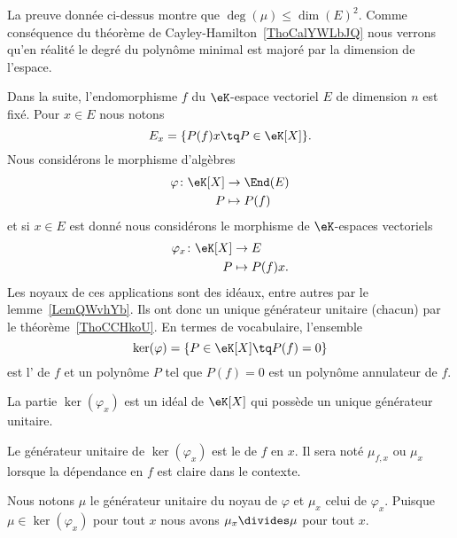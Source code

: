 \begin{remark}
	La preuve donnée ci-dessus montre que \( \deg(\mu)\leq \dim(E)^2\). Comme conséquence du théorème de Cayley-Hamilton~\ref{ThoCalYWLbJQ} nous verrons qu'en réalité le degré du polynôme minimal est majoré par la dimension de l'espace.
\end{remark}

Dans la suite, l'endomorphisme \( f\) du \( \eK\)-espace vectoriel \( E\) de dimension \( n\) est fixé. Pour \( x\in E\) nous notons
\begin{equation}            \label{EqooOAYDooEpZELo}
	E_x=\{ P(f)x\tq P\in \eK[X] \}.
\end{equation}
Nous considérons le morphisme d'algèbres
\begin{equation}
	\begin{aligned}
		\varphi\colon \eK[X] & \to \End(E)  \\
		P                    & \mapsto P(f)
	\end{aligned}
\end{equation}
et si \( x\in E\) est donné nous considérons le morphisme de \( \eK\)-espaces vectoriels
\begin{equation}
	\begin{aligned}
		\varphi_x\colon \eK[X] & \to E          \\
		P                      & \mapsto P(f)x.
	\end{aligned}
\end{equation}
Les noyaux de ces applications sont des idéaux, entre autres par le lemme~\ref{LemQWvhYb}. Ils ont donc un unique générateur unitaire (chacun) par le théorème~\ref{ThoCCHkoU}. En termes de vocabulaire, l'ensemble
\begin{equation}
	\ker(\varphi)=\{  P\in\eK[X]\tq P(f)=0  \}
\end{equation}
est l' de \( f\) et un polynôme \( P\) tel que \( P(f)=0\) est un polynôme annulateur de \( f\).

\begin{propositionDef}      \label{DEFooUICRooBGYhqQ}
	La partie \( \ker(\varphi_x)\) est un idéal de \( \eK[X]\) qui possède un unique générateur unitaire.

	Le générateur unitaire de \( \ker(\varphi_x)\) est le  de \( f\) en \( x\). Il sera noté \( \mu_{f,x}\) ou \( \mu_x\) lorsque la dépendance en \( f\) est claire dans le contexte.
\end{propositionDef}
Nous notons \( \mu\) le générateur unitaire du noyau de \( \varphi\) et \( \mu_x\) celui de \( \varphi_x\). Puisque \( \mu\in\ker(\varphi_x)\) pour tout \( x\) nous avons \( \mu_x\divides \mu\) pour tout \( x\).

